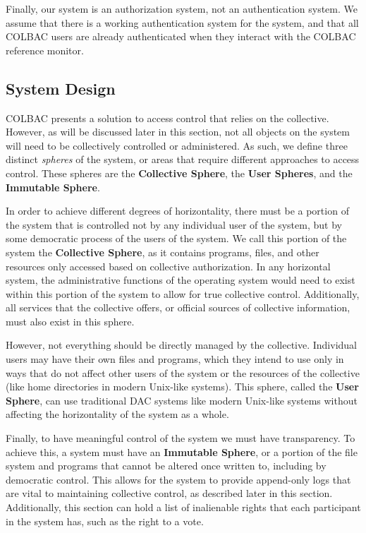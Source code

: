 Finally, our system is an authorization system, not an authentication system. We
assume that there is a working authentication system for the system, and that
all COLBAC users are already authenticated when they interact with the COLBAC
reference monitor.
\vspace{-.5em}
\subsection{System Design}
\label{sec:colbacdesign}
COLBAC presents a solution to access control that relies on the collective.
However, as will be discussed later in this section, not all objects on the
system will need to be collectively controlled or administered. As such, we
define three distinct \textit{spheres} of the system, or areas that require
different approaches to access control. These spheres are the \textbf{Collective
Sphere}, the \textbf{User Spheres}, and the \textbf{Immutable Sphere}.

In order to achieve different degrees of horizontality, there must be a portion
of the system that is controlled not by any individual user of the system, but
by some democratic process of the users of the system. We call this portion of
the system the \textbf{Collective Sphere}, as it contains programs, files, and
other resources only accessed based on collective authorization. In any
horizontal system, the administrative functions of the operating system would
need to exist within this portion of the system to allow for true collective
control. Additionally, all services that the collective offers, or official
sources of collective information, must also exist in this sphere.

However, not everything should be directly managed by the collective. Individual
users may have their own files and programs, which they intend to use only in
ways that do not affect other users of the system or the resources of the
collective (like home directories in modern Unix-like systems). This sphere,
called the \textbf{User Sphere}, can use traditional DAC systems like modern
Unix-like systems without affecting the horizontality of the system as a whole.

Finally, to have meaningful control of the system we must have transparency. To
achieve this, a system must have an \textbf{Immutable Sphere}, or a portion of
the file system and programs that cannot be altered once written to, including
by democratic control. This allows for the system to provide append-only logs
that are vital to maintaining collective control, as described later in this
section. Additionally, this section can hold a list of inalienable rights that
each participant in the system has, such as the right to a vote.

